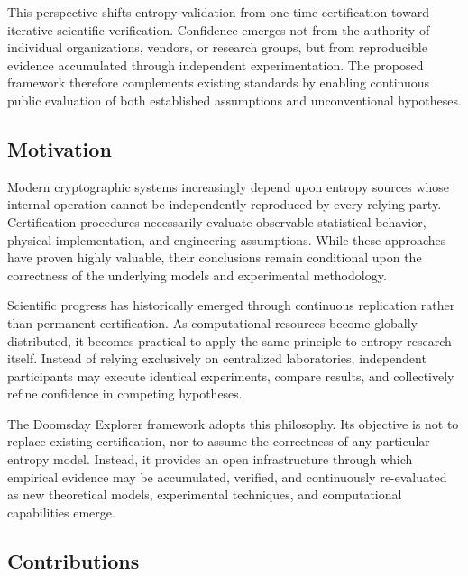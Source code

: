 \documentclass[11pt]{article}
\begin{document}
This perspective shifts entropy validation
from one-time certification toward
iterative scientific verification.
Confidence emerges not from the authority of
individual organizations,
vendors,
or research groups,
but from reproducible evidence accumulated through
independent experimentation.
The proposed framework therefore complements existing standards
by enabling continuous public evaluation of
both established assumptions
and unconventional hypotheses.


\subsection{Motivation}

Modern cryptographic systems increasingly depend upon
entropy sources whose internal operation cannot be
independently reproduced by every relying party.
Certification procedures necessarily evaluate
observable statistical behavior,
physical implementation,
and engineering assumptions.
While these approaches have proven highly valuable,
their conclusions remain conditional upon the correctness
of the underlying models and experimental methodology.

Scientific progress has historically emerged through
continuous replication rather than permanent certification.
As computational resources become globally distributed,
it becomes practical to apply the same principle
to entropy research itself.
Instead of relying exclusively on centralized laboratories,
independent participants may execute identical experiments,
compare results,
and collectively refine confidence in competing hypotheses.

The Doomsday Explorer framework adopts this philosophy.
Its objective is not to replace existing certification,
nor to assume the correctness of any particular entropy model.
Instead,
it provides an open infrastructure
through which empirical evidence may be accumulated,
verified,
and continuously re-evaluated
as new theoretical models,
experimental techniques,
and computational capabilities emerge.


\subsection{Contributions}
\end{document}
